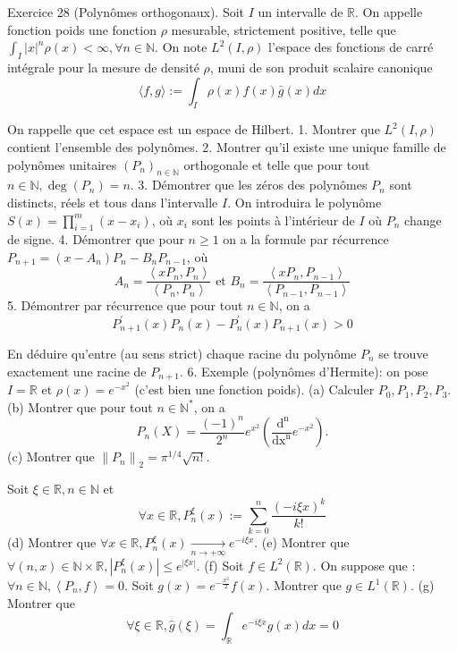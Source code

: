 \documentclass[12pt,a4paper]{article}
\begin{document}
Exercice 28 (Polynômes orthogonaux). Soit \(I\) un intervalle de \(\mathbb{R}\). On appelle fonction poids une fonction \(\rho\) mesurable, strictement positive, telle que \(\int_{I}|x|^{n} \rho(x)<\infty, \forall n \in \mathbb{N}\). On note \(L^{2}(I, \rho)\) l'espace des fonctions de carré intégrale pour la mesure de densité \(\rho\), muni de son produit scalaire canonique
\[
\langle f, g\rangle:=\int_{I} \rho(x) f(x) \bar{g}(x) d x
\]

On rappelle que cet espace est un espace de Hilbert.
1. Montrer que \(L^{2}(I, \rho)\) contient l'ensemble des polynômes.
2. Montrer qu'il existe une unique famille de polynômes unitaires \(\left(P_{n}\right)_{n \in \mathbb{N}}\) orthogonale et telle que pour tout \(n \in \mathbb{N}, \operatorname{deg}\left(P_{n}\right)=n\).
3. Démontrer que les zéros des polynômes \(P_{n}\) sont distincts, réels et tous dans l'intervalle \(I\). On introduira le polynôme \(S(x)=\prod_{i=1}^{m}\left(x-x_{i}\right)\), où \(x_{i}\) sont les points à l'intérieur de \(I\) où \(P_{n}\) change de signe.
4. Démontrer que pour \(n \geqslant 1\) on a la formule par récurrence \(P_{n+1}=\left(x-A_{n}\right) P_{n}-B_{n} P_{n-1}\), où
\[
A_{n}=\frac{\left\langle x P_{n}, P_{n}\right\rangle}{\left\langle P_{n}, P_{n}\right\rangle} \text { et } B_{n}=\frac{\left\langle x P_{n}, P_{n-1}\right\rangle}{\left\langle P_{n-1}, P_{n-1}\right\rangle}
\]
5. Démontrer par récurrence que pour tout \(n \in \mathbb{N}\), on a
\[
P_{n+1}^{\prime}(x) P_{n}(x)-P_{n}^{\prime}(x) P_{n+1}(x)>0
\]

En déduire qu'entre (au sens strict) chaque racine du polynôme \(P_{n}\) se trouve exactement une racine de \(P_{n+1}\).
6. Exemple (polynômes d'Hermite): on pose \(I=\mathbb{R}\) et \(\rho(x)=e^{-x^{2}}\) (c'est bien une fonction poids).
(a) Calculer \(P_{0}, P_{1}, P_{2}, P_{3}\).
(b) Montrer que pour tout \(n \in \mathbb{N}^{*}\), on a
\[
P_{n}(X)=\frac{(-1)^{n}}{2^{n}} e^{x^{2}}\left(\frac{\mathrm{~d}^{\mathrm{n}}}{\mathrm{dx}^{\mathrm{n}}} e^{-x^{2}}\right) .
\]
(c) Montrer que \(\left\|P_{n}\right\|_{2}=\pi^{1 / 4} \sqrt{n!}\).

Soit \(\xi \in \mathbb{R}, n \in \mathbb{N}\) et
\[
\forall x \in \mathbb{R}, P_{n}^{\xi}(x):=\sum_{k=0}^{n} \frac{(-i \xi x)^{k}}{k!}
\]
(d) Montrer que \(\forall x \in \mathbb{R}, P_{n}^{\xi}(x) \underset{n \rightarrow+\infty}{\rightarrow} e^{-i \xi x}\).
(e) Montrer que \(\forall(n, x) \in \mathbb{N} \times \mathbb{R},\left|P_{n}^{\xi}(x)\right| \leq e^{|\xi x|}\).
(f) Soit \(f \in L^{2}(\mathbb{R})\). On suppose que : \(\forall n \in \mathbb{N},\left\langle P_{n}, f\right\rangle=0\). Soit \(g(x)=e^{-\frac{x^{2}}{2}} f(x)\). Montrer que \(g \in L^{1}(\mathbb{R})\).
(g) Montrer que
\[
\forall \xi \in \mathbb{R}, \hat{g}(\xi)=\int_{\mathbb{R}} e^{-i \xi x} g(x) d x=0
\]
\end{document}
